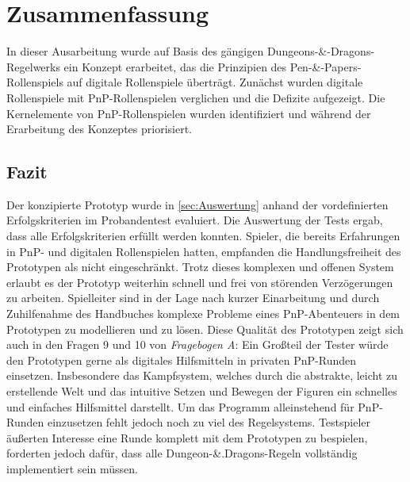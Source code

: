 \chapter{Zusammenfassung}
\label{conclusion}
In dieser Ausarbeitung wurde auf Basis des gängigen Dungeons-\&-Dragons-Regel\-werks ein Konzept erarbeitet, das die Prinzipien des Pen-\&-Papers-Rollenspiels auf digitale Rollenspiele überträgt. Zunächst wurden digitale Rollenspiele mit PnP-Rollenspielen verglichen und die Defizite aufgezeigt. Die Kernelemente von PnP-Rollenspielen wurden identifiziert und während der Erarbeitung des Konzeptes priorisiert.\\

\section{Fazit}
Der konzipierte Prototyp wurde in \ref{sec:Auswertung} anhand der vordefinierten Erfolgskriterien im Probandentest evaluiert. Die Auswertung der Tests ergab, dass alle Erfolgskriterien erfüllt werden konnten. Spieler, die bereits Erfahrungen in PnP- und digitalen Rollenspielen hatten, empfanden die Handlungsfreiheit des Prototypen als nicht eingeschränkt. Trotz dieses komplexen und offenen System erlaubt es der Prototyp weiterhin schnell und frei von störenden Verzögerungen zu arbeiten. Spielleiter sind in der Lage nach kurzer Einarbeitung und durch Zuhilfenahme des Handbuches komplexe Probleme eines PnP-Abenteuers in dem Prototypen zu modellieren und zu lösen. Diese Qualität des Prototypen zeigt sich auch in den Fragen 9 und 10 von \emph{Fragebogen A}: Ein Großteil der Tester würde den Prototypen gerne als digitales Hilfsmitteln in privaten PnP-Runden einsetzen. Insbesondere das Kampfsystem, welches durch die abstrakte, leicht zu erstellende Welt und das intuitive Setzen und Bewegen der Figuren ein schnelles und einfaches Hilfsmittel darstellt.\newline
Um das Programm alleinstehend für PnP-Runden einzusetzen fehlt jedoch noch zu viel des Regelsystems. Testspieler äußerten Interesse eine Runde komplett mit dem Prototypen zu bespielen, forderten jedoch dafür, dass alle Dungeon-\&.Dragons-Regeln vollständig implementiert sein müssen.



